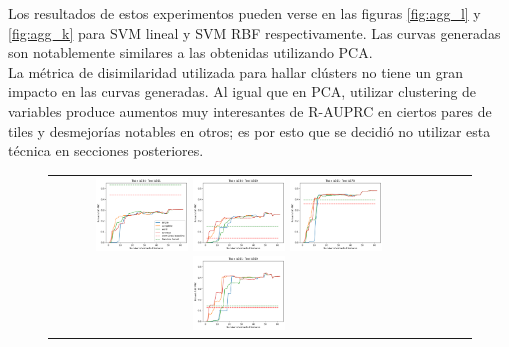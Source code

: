 Los resultados de estos experimentos pueden verse en las figuras \ref{fig:agg_l} y \ref{fig:agg_k} para SVM lineal y SVM RBF respectivamente. Las curvas generadas son notablemente similares a las obtenidas utilizando PCA. \\

La métrica de disimilaridad utilizada para hallar clústers no tiene un gran impacto en las curvas generadas. Al igual que en PCA, utilizar clustering de variables produce aumentos muy interesantes de R-AUPRC en ciertos pares de tiles y desmejorías notables en otros; es por esto que se decidió no utilizar esta técnica en secciones posteriores.

\begin{figure}[h!]
\begin{tabular}{cccc}
  \includegraphics[width=0.25\textwidth]{Kap5/linear_ALL_LINKAGES_train=b234test=b261.png}  
  \includegraphics[width=0.25\textwidth]{Kap5/linear_ALL_LINKAGES_train=b234test=b360.png}
  \includegraphics[width=0.25\textwidth]{Kap5/linear_ALL_LINKAGES_train=b261test=b278.png}  
  \includegraphics[width=0.25\textwidth]{Kap5/linear_ALL_LINKAGES_train=b261test=b360.png} \\


\end{tabular}
\end{figure}
